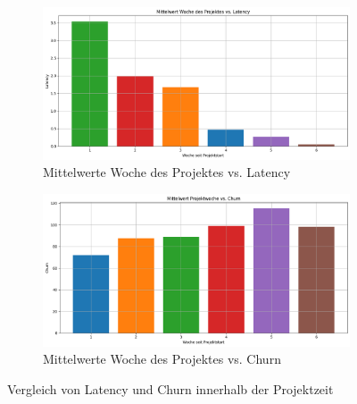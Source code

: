 \begin{figure}[htbp]
    \centering
    \begin{subfigure}[b]{0.48\textwidth}
        \centering
        \includegraphics[width=\textwidth]{Figures/mittelwert-woche-lateny.png}
        \caption{Mittelwerte Woche des Projektes vs. Latency}
        \label{fig:mittelwert-woche-lateny}
    \end{subfigure}
    \hfill
    \begin{subfigure}[b]{0.48\textwidth}
        \centering
        \includegraphics[width=\textwidth]{Figures/mittelwert-woche-churn.png}
        \caption{Mittelwerte Woche des Projektes vs. Churn}
        \label{fig:mittelwert-woche-churn}
    \end{subfigure}
    \caption{Vergleich von Latency und Churn innerhalb der Projektzeit}
    \label{fig:vergleich-latency-churn-projektzeit}
\end{figure}

